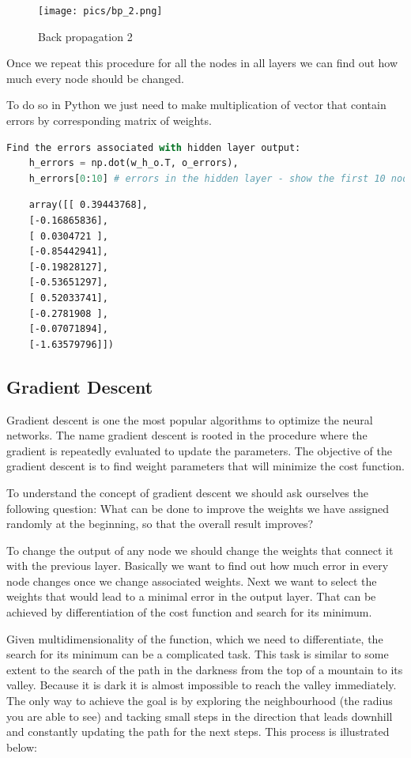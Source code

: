 \begin{figure}[H]
    \texttt{[image: pics/bp\_2.png]}
    \caption{\label{fig:bp2} Back propagation 2}
\end{figure}

Once we repeat this procedure for all the nodes in all layers we can find out how much every node should be changed.

To do so in Python we just need to make multiplication of vector that contain errors by corresponding matrix of weights.

\begin{lstlisting}[language=Python]
    Find the errors associated with hidden layer output:
    h_errors = np.dot(w_h_o.T, o_errors),
    h_errors[0:10] # errors in the hidden layer - show the first 10 nodes out of 90.
\end{lstlisting}

\begin{lstlisting}
    array([[ 0.39443768],
    [-0.16865836],
    [ 0.0304721 ],
    [-0.85442941],
    [-0.19828127],
    [-0.53651297],
    [ 0.52033741],
    [-0.2781908 ],
    [-0.07071894],
    [-1.63579796]])
\end{lstlisting}

\subsection{Gradient Descent}

Gradient descent is one the most popular algorithms to optimize the neural networks. The name gradient descent is rooted in the procedure where the gradient is repeatedly evaluated to update the parameters. The objective of the gradient descent is to find weight parameters that will minimize the cost function.

To understand the concept of gradient descent we should ask ourselves the following question: What can be done to improve the weights we have assigned randomly at the beginning, so that the overall result improves?

To change the output of any node we should change the weights that connect it with the previous layer. Basically we want to find out how much error in every node changes once we change associated weights. Next we want to select the weights that would lead to a minimal error in the output layer. That can be achieved by differentiation of the cost function and search for its minimum.

Given multidimensionality of the function, which we need to differentiate, the search for its minimum can be a complicated task. This task is similar to some extent to the search of the path in the darkness from the top of a mountain to its valley. Because it is dark it is almost impossible to reach the valley immediately. The only way to achieve the goal is by exploring the neighbourhood (the radius you are able to see) and tacking small steps in the direction that leads downhill and constantly updating the path for the next steps. This process is illustrated below:

